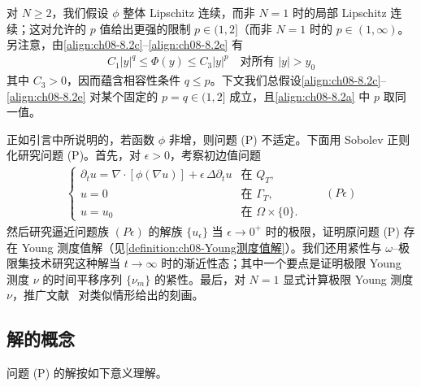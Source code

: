\documentclass[../../main.tex]{subfiles}%
\begin{document}
\begin{remark}\label{remark:ch08-8.1.1}
对 $N\geqslant2$，我们假设 $\phi$ 整体 Lipschitz 连续，而非 $N=1$ 时的局部 Lipschitz 连续；这对允许的 $p$ 值给出更强的限制 $p\in(1,2]$（而非 $N=1$ 时的 $p\in(1,\infty)$。另注意，由\eqref{align:ch08-8.2c}--\eqref{align:ch08-8.2e} 有
\begin{align}
C_1|y|^q\leqslant\Phi(y)\leqslant C_3|y|^p\quad\text{对所有 }|y|>y_0 \label{align:ch08-8.3}
\end{align}
其中 $C_3>0$，因而蕴含相容性条件 $q\leqslant p$。下文我们总假设\eqref{align:ch08-8.2c}--\eqref{align:ch08-8.2e} 对某个固定的 $p=q\in(1,2]$ 成立，且\eqref{align:ch08-8.2a} 中 $p$ 取同一值。
\end{remark}

正如引言中所说明的，若函数 $\phi$ 非增，则问题 (P) 不适定。下面用 Sobolev 正则化研究问题 (P)。首先，对 $\epsilon>0$，考察初边值问题
\begin{align*}
\begin{cases}
\partial_t u=\nabla\cdot[\phi(\nabla u)]+\epsilon\,\Delta\partial_t u & \text{在 }Q_T,\\
u=0 & \text{在 }\Gamma_T,\\
u=u_0 & \text{在 }\Omega\times\{0\}.
\end{cases}
\qquad(P\epsilon)
\end{align*}
然后研究逼近问题族 $(P\epsilon)$ 的解族 $\{u_\epsilon\}$ 当 $\epsilon\to0^+$ 时的极限，证明原问题 (P) 存在 Young 测度值解（见\cref{definition:ch08-Young测度值解}）。我们还用紧性与 $\omega$--极限集技术研究这种解当 $t\to\infty$ 时的渐近性态；其中一个要点是证明极限 Young 测度 $\nu$ 的时间平移序列 $\{\nu_m\}$ 的紧性。最后，对 $N=1$ 显式计算极限 Young 测度 $\nu$，推广文献~\cite{ref83} 对类似情形给出的刻画。

\subsection{解的概念}\label{subsection:ch08-解的概念}

问题 (P) 的解按如下意义理解。
\end{document}
